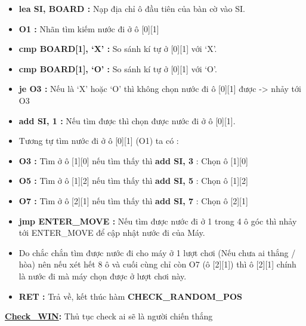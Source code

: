 \begin{itemize}
    \item \textbf{lea SI, BOARD :} Nạp địa chỉ ô đầu tiên của bàn cờ vào SI.
    \item \textbf{O1 :} Nhãn tìm kiếm nước đi ở ô [0][1] 
    \item \textbf{cmp BOARD[1], ‘X’ :} So sánh kí tự ở [0][1] với ‘X’.
    \item \textbf{cmp BOARD[1], ‘O’ : }So sánh kí tự ở [0][1] với ‘O’.
    \item \textbf{je O3 : }Nếu là ‘X’ hoặc ‘O’ thì không chọn nước đi ô [0][1] được -> nhảy tới O3 
    \item \textbf{add SI, 1 :} Nếu tìm được thì chọn được nước đi ở ô [0][1].
    \item Tương tự tìm nước đi ở ô [0][1] (O1) ta có : 
    \item \textbf{O3 :} Tìm ở ô [1][0] nếu tìm thấy thì \textbf{add SI, 3} : Chọn ô [1][0]
    \item \textbf{O5 :} Tìm ở ô [1][2] nếu tìm thấy thì \textbf{add SI, 5} : Chọn ô [1][2]
    \item \textbf{O7 :} Tìm ở ô [2][1] nếu tìm thấy thì \textbf{add SI, 7} : Chọn ô [2][1]
    \item \textbf{jmp ENTER\_MOVE :} Nếu tìm được nước đi ở 1 trong 4 ô góc thì nhảy tới ENTER\_MOVE để cập nhật nước đi của Máy.
    \item Do chắc chắn tìm được nước đi cho máy ở 1 lượt chơi (Nếu chưa ai thắng / hòa) nên nếu xét hết 8 ô và cuối cùng chỉ còn O7 (ô [2][1]) thì ô [2][1] chính là nước đi mà máy chọn được ở lượt chơi này.
    \item \textbf{RET :} Trả về, kết thúc hàm \textbf{CHECK\_RANDOM\_POS}
\end{itemize}


\textbf{\underline{Check\_WIN}: }Thủ tục check ai sẽ là người chiến thắng\\

